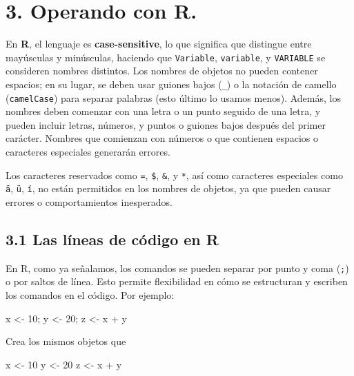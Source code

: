 \documentclass[
  letterpaper,
]{scrbook}
\newenvironment{Shaded}{\begin{snugshade}}{\end{snugshade}}
\newcommand{\DecValTok}[1]{\textcolor[rgb]{0.68,0.00,0.00}{#1}}
\newcommand{\NormalTok}[1]{\textcolor[rgb]{0.00,0.23,0.31}{#1}}
\newcommand{\OtherTok}[1]{\textcolor[rgb]{0.00,0.23,0.31}{#1}}
\newcommand{\SpecialCharTok}[1]{\textcolor[rgb]{0.37,0.37,0.37}{#1}}
\begin{document}
\hypertarget{operando-con-r.}{%
\section{3. Operando con R.}\label{operando-con-r.}}

En \textbf{R}, el lenguaje es \textbf{case-sensitive}, lo que significa
que distingue entre mayúsculas y minúsculas, haciendo que
\texttt{Variable}, \texttt{variable}, y \texttt{VARIABLE} se consideren
nombres distintos. Los nombres de objetos no pueden contener espacios;
en su lugar, se deben usar guiones bajos (\texttt{\_}) o la notación de
camello (\texttt{camelCase}) para separar palabras (esto último lo
usamos menos). Además, los nombres deben comenzar con una letra o un
punto seguido de una letra, y pueden incluir letras, números, y puntos o
guiones bajos después del primer carácter. Nombres que comienzan con
números o que contienen espacios o caracteres especiales generarán
errores.

Los caracteres reservados como \texttt{=}, \texttt{\$}, \texttt{\&}, y
\texttt{*}, así como caracteres especiales como \texttt{ä}, \texttt{ü},
\texttt{í}, no están permitidos en los nombres de objetos, ya que pueden
causar errores o comportamientos inesperados.

\hypertarget{las-luxedneas-de-cuxf3digo-en-r}{%
\subsection{3.1 Las líneas de código en
R}\label{las-luxedneas-de-cuxf3digo-en-r}}

En R, como ya señalamos, los comandos se pueden separar por punto y coma
(\texttt{;}) o por saltos de línea. Esto permite flexibilidad en cómo se
estructuran y escriben los comandos en el código. Por ejemplo:

\begin{Shaded}
\begin{Highlighting}[]
\NormalTok{x }\OtherTok{\textless{}{-}} \DecValTok{10}\NormalTok{; y }\OtherTok{\textless{}{-}} \DecValTok{20}\NormalTok{; z }\OtherTok{\textless{}{-}}\NormalTok{ x }\SpecialCharTok{+}\NormalTok{ y}
\end{Highlighting}
\end{Shaded}

Crea los mismos objetos que

\begin{Shaded}
\begin{Highlighting}[]
\NormalTok{x }\OtherTok{\textless{}{-}} \DecValTok{10}
\NormalTok{y }\OtherTok{\textless{}{-}} \DecValTok{20}
\NormalTok{z }\OtherTok{\textless{}{-}}\NormalTok{ x }\SpecialCharTok{+}\NormalTok{ y}
\end{Highlighting}
\end{Shaded}
\end{document}
